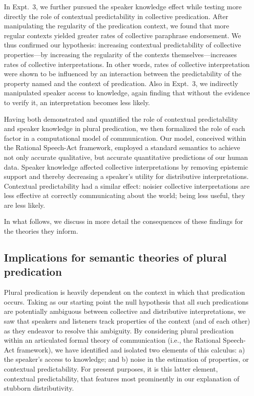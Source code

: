 \documentclass[linguex]{sp}
\begin{document}
In Expt.~3, we further pursued the speaker knowledge effect while testing more directly the role of contextual predictability in collective predication. After manipulating the regularity of the predication context, we found that more regular contexts yielded greater rates of collective paraphrase endorsement. We thus confirmed our hypothesis: increasing contextual predictability of collective properties---by increasing the regularity of the contexts themselves---increases rates of collective interpretations. In other words, rates of collective interpretation were shown to be influenced by an interaction between the predictability of the property named and the context of predication. Also in Expt.~3, we indirectly manipulated speaker access to knowledge, again finding that without the evidence to verify it, an interpretation becomes less likely.

Having both demonstrated and quantified the role of contextual predictability and speaker knowledge in plural predication, we then formalized the role of each factor in a computational model of communication. Our model, conceived within the Rational Speech-Act framework, employed a standard semantics to achieve not only accurate qualitative, but accurate quantitative predictions of our human data. Speaker knowledge affected collective interpretations by removing epistemic support and thereby decreasing a speaker's utility for distributive interpretations. Contextual predictability had a similar effect: noisier collective interpretations are less effective at correctly communicating about the world; being less useful, they are less likely.

In what follows, we discuss in more detail the consequences of these findings for the theories they inform.

\subsection{Implications for semantic theories of plural predication}

Plural predication is heavily dependent on the context in which that predication occurs. Taking as our starting point the null hypothesis that all such predications are potentially ambiguous between collective and distributive interpretations, we saw that speakers and listeners track properties of the context (and of each other) as they endeavor to resolve this ambiguity. By considering plural predication within an articulated formal theory of communication (i.e., the Rational Speech-Act framework), we have identified and isolated two elements of this calculus: a) the speaker's access to knowledge; and b) noise in the estimation of properties, or contextual predictability. For present purposes, it is this latter element, contextual predictability, that features most prominently in our explanation of stubborn distributivity.
\end{document}
